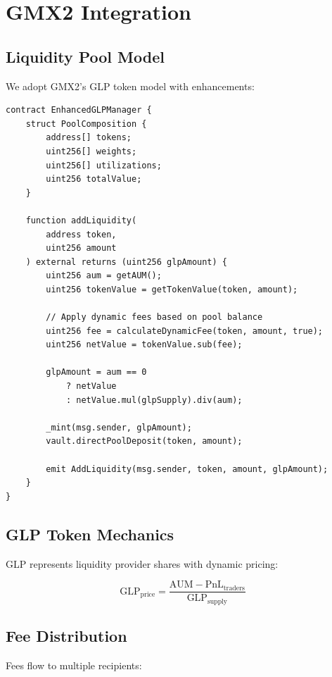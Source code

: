\section{GMX2 Integration}


\subsection{Liquidity Pool Model}

We adopt GMX2's GLP token model with enhancements:

\begin{lstlisting}[caption={Enhanced GLP Manager}]
contract EnhancedGLPManager {
    struct PoolComposition {
        address[] tokens;
        uint256[] weights;
        uint256[] utilizations;
        uint256 totalValue;
    }

    function addLiquidity(
        address token,
        uint256 amount
    ) external returns (uint256 glpAmount) {
        uint256 aum = getAUM();
        uint256 tokenValue = getTokenValue(token, amount);

        // Apply dynamic fees based on pool balance
        uint256 fee = calculateDynamicFee(token, amount, true);
        uint256 netValue = tokenValue.sub(fee);

        glpAmount = aum == 0
            ? netValue
            : netValue.mul(glpSupply).div(aum);

        _mint(msg.sender, glpAmount);
        vault.directPoolDeposit(token, amount);

        emit AddLiquidity(msg.sender, token, amount, glpAmount);
    }
}
\end{lstlisting}

\subsection{GLP Token Mechanics}

GLP represents liquidity provider shares with dynamic pricing:

\begin{equation}
\text{GLP}_{\text{price}} = \frac{\text{AUM} - \text{PnL}_{\text{traders}}}{\text{GLP}_{\text{supply}}}
\end{equation}

\subsection{Fee Distribution}

Fees flow to multiple recipients:

